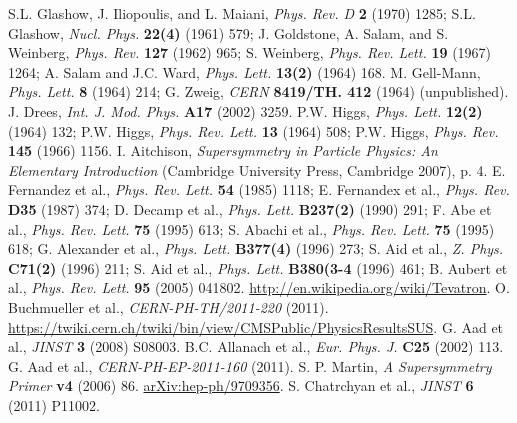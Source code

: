 \documentclass[12pt, letterpaper]{report}
\begin{document}
\begin{thebibliography}{99}
 S.L. Glashow, J. Iliopoulis, and L. Maiani, \textit{Phys. Rev. D} \textbf{2} (1970) 1285; S.L. Glashow, \textit{Nucl. Phys.} \textbf{22(4)} (1961) 579; J. Goldstone, A. Salam, and S. Weinberg, \textit{Phys. Rev.} \textbf{127} (1962) 965; S. Weinberg, \textit{Phys. Rev. Lett.} \textbf{19} (1967) 1264; A. Salam and J.C. Ward, \textit{Phys. Lett.} \textbf{13(2)} (1964) 168.
 M. Gell-Mann, \textit{Phys. Lett.} \textbf{8} (1964) 214; G. Zweig, \textit{CERN} \textbf{8419/TH. 412} (1964) (unpublished).
 J. Drees, \textit{Int. J. Mod. Phys.} \textbf{A17} (2002) 3259.
 P.W. Higgs, \textit{Phys. Lett.} \textbf{12(2)} (1964) 132; P.W. Higgs, \textit{Phys. Rev. Lett.} \textbf{13} (1964) 508; P.W. Higgs, \textit{Phys. Rev.} \textbf{145} (1966) 1156.
 I. Aitchison, \textit{Supersymmetry in Particle Physics: An Elementary Introduction} (Cambridge University Press, Cambridge 2007), p. 4.
 E. Fernandez et al., \textit{Phys. Rev. Lett.} \textbf{54} (1985) 1118; E. Fernandex et al., \textit{Phys. Rev.} \textbf{D35} (1987) 374; D. Decamp et al., \textit{Phys. Lett.} \textbf{B237(2)} (1990) 291; F. Abe et al., \textit{Phys. Rev. Lett.} \textbf{75} (1995) 613; S. Abachi et al., \textit{Phys. Rev. Lett.} \textbf{75} (1995) 618; G. Alexander et al., \textit{Phys. Lett.} \textbf{B377(4)} (1996) 273; S. Aid et al., \textit{Z. Phys.} \textbf{C71(2)} (1996) 211; S. Aid et al., \textit{Phys. Lett.} \textbf{B380(3-4} (1996) 461; B. Aubert et al., \textit{Phys. Rev. Lett.} \textbf{95} (2005) 041802.
 \url{http://en.wikipedia.org/wiki/Tevatron}.
 O. Buchmueller et al., \textit{CERN-PH-TH/2011-220} (2011).
 \url{https://twiki.cern.ch/twiki/bin/view/CMSPublic/PhysicsResultsSUS}.
 G. Aad et al., \textit{JINST} \textbf{3} (2008) S08003.
 B.C. Allanach et al., \textit{Eur. Phys. J.} \textbf{C25} (2002) 113.
 G. Aad et al., \textit{CERN-PH-EP-2011-160} (2011).
 S. P. Martin, \textit{A Supersymmetry Primer} \textbf{v4} (2006) 86.  \href{http://arxiv.org/abs/hep-ph/9709356}{arXiv:hep-ph/9709356}.
 S. Chatrchyan et al., \textit{JINST} \textbf{6} (2011) P11002.
\end{thebibliography}
\end{document}
